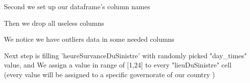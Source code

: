 Second we set up our dataframe's column names
\begin{figure}[H]
\centering
{}
\end{figure}

Then we drop all useless columns  
\begin{figure}[H]
\centering
{}
\end{figure}

We notice we have outliers data in some needed columns
\begin{figure}[H]
\centering
{}
\end{figure}

Next step is filling 'heureSurvanceDuSinistre' with randomly picked "day\_times" value, and We assign a value in range of [1,24] to every "lieuDuSinistre" cell (every value will be assigned to a specific governorate of our country )
\begin{figure}[H]
\centering
{}
\end{figure}

